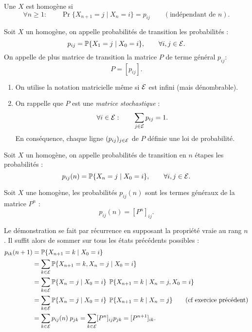 \begin{definition}[\CM homogène]
  Une \cM $X$ est homogène si
  $$
  \forall n \geq 1: \qquad 
  \Pr\{X_{n+1} = j \mid X_n = i\} = p_{ij} 
  \qquad (\text{indépendant de $n$}).
  $$
\end{definition}

\begin{definition}
  Soit $X$ un \cM homogène, on appelle probabilités de transition les probabilités :
  $$
  p_{ij} = \operatorname{\mathbb{P}}\{X_1 = j \mid X_0 = i\}, \qquad \forall i, j \in \mathcal{E}.
  $$
  On appelle de plus matrice de transition la matrice $P$ de terme général $p_{ij}$:
  $$
  P = [p_{ij}].
  $$
\end{definition}

\remarks
\begin{enumerate}
  \item On utilise la notation matricielle même si $\mathcal{E}$ est infini (mais dénombrable).
  \item On rappelle que $P$ est une {\em matrice stochastique} : 
  $$
  \forall i \in \mathcal{E}: \qquad \sum_{j \in \mathcal{E}} p_{ij} = 1.
  $$
  En conséquence, chaque ligne $(p_{ij})_{j \in \mathcal{E}}$ de $P$ définie une loi de probabilité.
\end{enumerate}

\begin{definition}
  Soit $X$ un \cM homogène, on appelle probabilités de transition en $n$ étapes les probabilités :
  $$
  p_{ij}(n) = \operatorname{\mathbb{P}}\{X_n = j \mid X_0 = i\}, \qquad \forall i, j \in \mathcal{E}.  
  $$
\end{definition}

\begin{proposition} \label{prop:transitionNEtapes}
  Soit $X$ une \cM homogène, les probabilités $p_{ij}(n)$ sont les termes généraux de la matrice $P^n$ : 
  $$
  p_{ij}(n) = [P^n]_{ij}.
  $$
\end{proposition}

\proof
Le démonstration se fait par récurrence en supposant la propriété vraie au rang $n$. Il suffit alors de sommer sur tous les états précédents possibles : 
\begin{align*}
  p_{ik}(n+1) 
  & = \operatorname{\mathbb{P}}\{X_{n+1} = k \mid X_0=i\} \\
  & = \sum_{k \in \mathcal{E}} \operatorname{\mathbb{P}}\{X_{n+1} = k, X_n = j \mid X_0=i\} \\
  & = \sum_{k \in \mathcal{E}} \operatorname{\mathbb{P}}\{X_n = j \mid X_0=i\} \; \operatorname{\mathbb{P}}\{X_{n+1} = k \mid X_n = j, X_0=i\} \\
  & = \sum_{k \in \mathcal{E}} \operatorname{\mathbb{P}}\{X_n = j \mid X_0=i\} \; \operatorname{\mathbb{P}}\{X_{n+1} = k \mid X_n = j\} \qquad (\text{cf exercice précédent})\\
  & = \sum_{k \in \mathcal{E}} p_{ij}(n) \; p_{jk} = \sum_{k \in \mathcal{E}} [P^n]_{ij} p_{jk} = [P^{n+1}]_{ik}.
\end{align*}
\eproof

